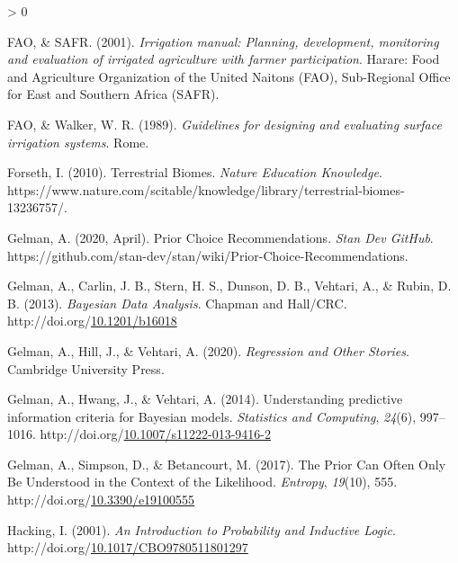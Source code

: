 \documentclass[12pt,twoside]{reedthesis}
\newlength{\cslhangindent}
\newenvironment{CSLReferences}[2] %
 {%
  \setlength{\parindent}{0pt}
  \ifodd #1 \everypar{\setlength{\hangindent}{\cslhangindent}}\ignorespaces\fi
  \ifnum #2 > 0
  \setlength{\parskip}{#2\baselineskip}
  \fi
 }%
 {}
\begin{document}
\begin{CSLReferences}{1}{0}
\leavevmode\hypertarget{ref-faoIrrigationManualPlanning2001}{}%
FAO, \& SAFR. (2001). \emph{Irrigation manual: Planning, development, monitoring and evaluation of irrigated agriculture with farmer participation}. {Harare}: {Food and Agriculture Organization of the United Naitons (FAO), Sub-Regional Office for East and Southern Africa (SAFR)}.

\leavevmode\hypertarget{ref-faoGuidelinesDesigningEvaluating1989}{}%
FAO, \& Walker, W. R. (1989). \emph{Guidelines for designing and evaluating surface irrigation systems}. {Rome}.

\leavevmode\hypertarget{ref-forsethTerrestrialBiomes2010}{}%
Forseth, I. (2010). Terrestrial {Biomes}. \emph{Nature Education Knowledge}. https://www.nature.com/scitable/knowledge/library/terrestrial-biomes-13236757/.

\leavevmode\hypertarget{ref-gelmanPriorChoiceRecommendations2020}{}%
Gelman, A. (2020, April). Prior {Choice Recommendations}. \emph{Stan Dev GitHub}. https://github.com/stan-dev/stan/wiki/Prior-Choice-Recommendations.

\leavevmode\hypertarget{ref-gelmanBayesianDataAnalysis2013}{}%
Gelman, A., Carlin, J. B., Stern, H. S., Dunson, D. B., Vehtari, A., \& Rubin, D. B. (2013). \emph{Bayesian {Data Analysis}}. {Chapman and Hall/CRC}. http://doi.org/\href{https://doi.org/10.1201/b16018}{10.1201/b16018}

\leavevmode\hypertarget{ref-gelmanRegressionOtherStories2020}{}%
Gelman, A., Hill, J., \& Vehtari, A. (2020). \emph{Regression and {Other Stories}}. {Cambridge University Press}.

\leavevmode\hypertarget{ref-gelmanUnderstandingPredictiveInformation2014}{}%
Gelman, A., Hwang, J., \& Vehtari, A. (2014). Understanding predictive information criteria for {Bayesian} models. \emph{Statistics and Computing}, \emph{24}(6), 997--1016. http://doi.org/\href{https://doi.org/10.1007/s11222-013-9416-2}{10.1007/s11222-013-9416-2}

\leavevmode\hypertarget{ref-gelmanPriorCanOften2017}{}%
Gelman, A., Simpson, D., \& Betancourt, M. (2017). The {Prior Can Often Only Be Understood} in the {Context} of the {Likelihood}. \emph{Entropy}, \emph{19}(10), 555. http://doi.org/\href{https://doi.org/10.3390/e19100555}{10.3390/e19100555}

\leavevmode\hypertarget{ref-hackingIntroductionProbabilityInductive2001}{}%
Hacking, I. (2001). \emph{An {Introduction} to {Probability} and {Inductive Logic}}. http://doi.org/\href{https://doi.org/10.1017/CBO9780511801297}{10.1017/CBO9780511801297}


\end{CSLReferences}
\end{document}
